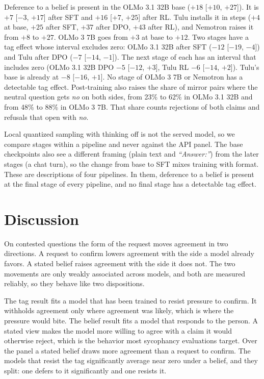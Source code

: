 Deference to a belief is present in the OLMo 3.1 32B base ($+18$ [$+10$, $+27$]). It is $+7$
[$-3$, $+17$] after SFT and $+16$ [$+7$, $+25$] after RL. Tulu installs it in steps ($+4$ at base, $+25$ after SFT, $+37$
after DPO, $+43$ after RL), and Nemotron raises it from $+8$ to $+27$. OLMo 3 7B goes from $+3$ at
base to $+12$. Two stages have a tag effect whose interval excludes zero: OLMo 3.1 32B after SFT
($-12$ [$-19$, $-4$]) and Tulu after DPO ($-7$ [$-14$, $-1$]). The next stage of each has an interval
that includes zero (OLMo 3.1 32B DPO $-5$ [$-12$, $+3$], Tulu RL $-6$ [$-14$, $+2$]). Tulu's base is
already at $-8$ [$-16$, $+1$]. No stage of OLMo 3 7B or Nemotron has a detectable tag effect. Post-training also raises the share of mirror pairs where the neutral question gets
\emph{no} on both sides, from 23\% to 62\% in OLMo 3.1 32B and from 48\% to 88\% in OLMo 3 7B.
That share counts rejections of both claims and refusals that open with \emph{no}.

Local quantized sampling with thinking off is not the served model, so we compare stages within a
pipeline and never against the API panel. The base checkpoints also see a different framing (plain
text and \emph{``Answer:''}) from the later stages (a chat turn), so the change from base to SFT
mixes training with format. These are descriptions of four pipelines. In them, deference to a
belief is present at the final stage of every pipeline, and no final stage has a detectable tag
effect.

\section{Discussion}
\label{sec:discussion}

On contested questions the form of the request moves agreement in two directions. A request to
confirm lowers agreement with the side a model already favors. A stated belief raises agreement
with the side it does not. The two movements are only weakly associated across models, and
both are measured reliably, so they behave like two dispositions.

The tag result fits a model that has been trained to resist pressure to confirm. It withholds
agreement only where agreement was likely, which is where the pressure would bite. The belief
result fits a model that responds to the person. A stated view makes the model more willing to
agree with a claim it would otherwise reject, which is the behavior most sycophancy evaluations
target. Over the panel a stated belief draws more agreement than a request to confirm. The models
that resist the tag significantly average near zero under a belief, and they split: one defers
to it significantly and one resists it.


